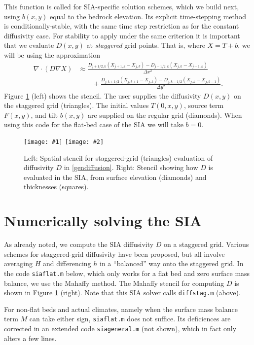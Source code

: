 \documentclass[letterpaper,final,12pt,reqno]{amsart}
\newcommand{\grad}{\nabla}
\newcommand{\Div}{\nabla\cdot}
\newcommand{\minput}[1]{
\vspace{0.8cm}
\VerbatimInput[frame=single,framesep=3mm,label=\fbox{\normalsize \textsl{\,#1.m\,}},fontfamily=courier,fontsize=\footnotesize]{tmp/#1.slim.m}
\vspace{0.5cm}
}
\newcommand{\twofigsizes}[5]{
\begin{figure}[ht]
\centering
\texttt{[image: \#1]} \quad
\texttt{[image: \#2]}
\caption{#3}
\label{fig:#1}
\end{figure}}
\begin{document}
\minput{diffstag}

This function is called for SIA-specific solution schemes, which we build next, using $b(x,y)$ equal to the bedrock elevation.  Its explicit time-stepping method is conditionally-stable, with the same time step restriction as for the constant diffusivity case.  For stability to apply under the same criterion it is important that we evaluate $D(x,y)$ at \emph{staggered} grid points.  That is, where $X=T+b$, we will be using the approximation
\begin{align*}
\Div \left(D \grad X\right) &\approx \frac{D_{j+1/2,k}(X_{j+1,k} - X_{j,k}) - D_{j-1/2,k}(X_{j,k} - X_{j-1,k})}{\Delta x^2} \\
	&\qquad + \frac{D_{j,k+1/2}(X_{j,k+1} - X_{j,k}) - D_{j,k-1/2}(X_{j,k} - X_{j,k-1})}{\Delta y^2}.
\end{align*}
Figure \ref{fig:diffstencil} (left) shows the stencil.  The user supplies the diffusivity $D(x,y)$ on the staggered grid (triangles).  The initial values $T(0,x,y)$, source term $F(x,y)$, and tilt $b(x,y)$ are supplied on the regular grid (diamonds).  When using this code for the flat-bed case of the SIA we will take $b=0$.

\twofigsizes{diffstencil}{mahaffystencil}{Left:  Spatial stencil for staggered-grid (triangles) evaluation of diffusivity $D$ in \eqref{gendiffusion}.  Right: Stencil showing how $D$ is evaluated in the SIA, from surface elevation (diamonds) and thicknesses (squares).}{2.2in}{2.2in}


\section{Numerically solving the SIA} \label{sec:numericalsia}

As already noted, we compute the SIA diffusivity $D$ on a staggered grid.  Various schemes for staggered-grid diffusivity have been proposed, but all involve averaging $H$ and differencing $h$ in a ``balanced'' way onto the staggered grid.  In the code \texttt{siaflat.m} below, which only works for a flat bed and zero surface mass balance, we use the Mahaffy \cite{Mahaffy} method.  The Mahaffy stencil for computing $D$ is shown in Figure \ref{fig:diffstencil} (right).  Note that this SIA solver calls \texttt{diffstag.m} (above).

For non-flat beds and actual climates, namely when the surface mass balance term $M$ can take either sign, \texttt{siaflat.m} does not suffice.  Its deficiences are corrected in an extended code \texttt{siageneral.m} (not shown), which in fact only alters a few lines.
\end{document}
